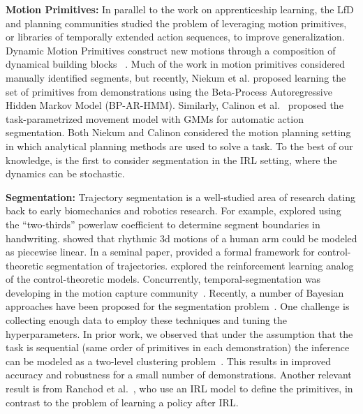 \vspace{0.25em}\noindent\textbf{Motion Primitives: } In parallel to the work on apprenticeship learning, the LfD and planning communities studied the problem of leveraging motion primitives, or libraries of temporally extended action sequences, to improve generalization. 
Dynamic Motion Primitives construct new motions through a composition of dynamical building blocks ~\citep{ijspreet2002learning,pastor2009learning,manschitz2015learning}.
Much of the work in motion primitives considered manually identified segments, but recently, Niekum et al. \citep{niekum2012learning} proposed learning the set of primitives from demonstrations using the Beta-Process Autoregressive Hidden Markov Model (BP-AR-HMM).
Similarly, Calinon et al.~\citep{calinon2014skills} proposed the task-parametrized movement model with GMMs for automatic action segmentation.
Both Niekum and Calinon considered the motion planning setting in which analytical planning methods are used to solve a task.
To the best of our knowledge, \hirl is the first to consider segmentation in the IRL setting, where the dynamics can be stochastic.

\vspace{0.25em}\noindent\textbf{Segmentation: } Trajectory segmentation is a well-studied area of research dating back to early biomechanics and robotics research.
For example, \cite{viviani1985segmentation} explored using the ``two-thirds'' powerlaw coefficient to determine segment boundaries in handwriting.
\cite{morasso1983three} showed that rhythmic 3d motions of a human arm could be modeled as piecewise linear.
In a seminal paper, \cite{sternad1999segmentation} provided a formal framework for control-theoretic segmentation of trajectories.
\cite{botvinick2009hierarchically} explored the reinforcement learning analog of the control-theoretic models.
Concurrently, temporal-segmentation was developing in the motion capture community~\citep{moeslund2001survey}.
Recently, a number of Bayesian approaches have been proposed for the segmentation problem~\citep{asfour2006imitation,calinon2004stochastic,kruger2010learning, vakanski2012trajectory,tanwani2016learning}.
One challenge is collecting enough data to employ these techniques and tuning the hyperparameters.
In prior work, we observed that under the assumption that the task is sequential (same order of primitives in each demonstration) the inference can be modeled as a two-level clustering problem~\citep{krishnan2015tsc}.
This results in improved accuracy and robustness for a small number of demonstrations.
Another relevant result is from Ranchod et al.~\citep{ranchod2015nonparametric}, who use an IRL model to define the primitives, in contrast to the problem of learning a policy after IRL.

